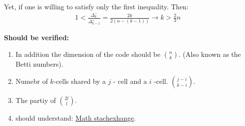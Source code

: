 \documentclass[manuscript,screen,review]{acmart}
\begin{document}

Yet, if one is willing to satisfy only the first inequality. Then: 
\begin{equation*}
  \begin{split}
    1 < \frac{\Delta_{k}^{-}}{\Delta_{k-1}^{+}} = \frac{2k}{2(n-(k-1))} \rightarrow k > \frac{2}{3}n
  \end{split}
\end{equation*}

\textbf{Should be verified:}
\begin{enumerate}
  \item In addition the dimension of the code should be ${ n \choose k } $. (Also known as the Betti numbers). 
  \item Numebr of $k$-cells shared by a $j$ - cell and a $i$ -cell. $  { j - i \choose  k- i }  $. 
  \item The partiy of ${ 2l \choose l }  $.  
  \item should understand: \href{https://math.stackexchange.com/questions/3242404/homology-of-n-dimensional-torus}{Math stachexhange}.
\end{enumerate}
\end{document}

